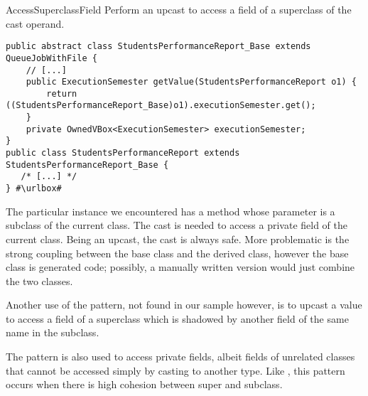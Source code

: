 \begin{pattern}{AccessSuperclassField}
Perform an upcast to access a field of a superclass of the cast operand.

\instances{}

\def\urlvar{http://bit.ly/FenixEdu_fenixedu_academic_2SQxlkC}
\begin{verbatim}
public abstract class StudentsPerformanceReport_Base extends QueueJobWithFile {
    // [...]
    public ExecutionSemester getValue(StudentsPerformanceReport o1) {
        return ((StudentsPerformanceReport_Base)o1).executionSemester.get();
    }
    private OwnedVBox<ExecutionSemester> executionSemester;
}
public class StudentsPerformanceReport extends StudentsPerformanceReport_Base {
   /* [...] */
} #\urlbox#
\end{verbatim}

\issues{}
The particular instance we encountered has a method whose parameter is a
  subclass of the current class. The cast is needed to access a private
  field of the current class.
  Being an upcast, the cast is always safe. More problematic is the strong coupling 
  between the base class and the derived class, however the base class is
  generated code; possibly, a manually written version would just combine the
  two classes.

  Another use of the pattern, not found in our sample however,
  is to upcast a value to access a field of a superclass 
  which is shadowed by another field of the same name in the subclass.

  The  pattern is also used to access
  private fields, albeit fields of unrelated classes that cannot be accessed
  simply by casting to another type.
  Like , this pattern occurs
  when there is high cohesion between super and subclass.

\end{pattern}
